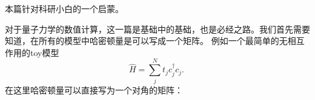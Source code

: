 
\begin{issues}
\issueDraft       %
\end{issues}
本篇针对科研小白的一个启蒙。

对于量子力学的数值计算，这一篇是基础中的基础，也是必经之路。我们首先需要知道，在所有的模型中哈密顿量是可以写成一个矩阵。
例如一个最简单的无相互作用的toy模型
\begin{equation}\label{ham1}
\hat{H}=  \sum_j^{N} t_j c_j^{\dagger}c_j.~
\end{equation}
在这里哈密顿量可以直接写为一个对角的矩阵：
\begin{equation}

\end{equation}

